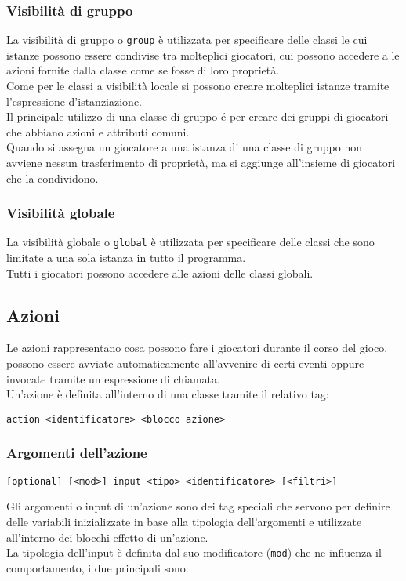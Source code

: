 \subsubsection{Visibilità di gruppo}
La visibilità di gruppo o \lstinline|group| è utilizzata per specificare delle classi le cui istanze possono
essere condivise tra molteplici giocatori, cui possono accedere a le azioni fornite dalla classe come 
se fosse di loro proprietà. \\
Come  per le classi a visibilità locale si possono creare molteplici istanze tramite l'espressione d'istanziazione. \\
Il principale utilizzo di una classe di gruppo é per creare dei gruppi di giocatori che abbiano
azioni e attributi comuni. \\
Quando si assegna un giocatore a una istanza di una classe di gruppo non avviene nessun trasferimento
di proprietà, ma si aggiunge all'insieme di giocatori che la condividono.

\subsubsection{Visibilità globale}
La visibilità globale o \lstinline|global| è utilizzata per specificare delle classi che sono 
limitate a una sola istanza in tutto il programma. \\
Tutti i giocatori possono accedere alle azioni delle classi globali.

\subsection{Azioni}
Le azioni rappresentano cosa possono fare i giocatori durante il corso del gioco, possono essere avviate
automaticamente all'avvenire di certi eventi oppure invocate tramite un espressione di chiamata.\\
Un'azione è definita all'interno di una classe tramite il relativo tag: \\
\begin{lstlisting}
action <identificatore> <blocco azione>
\end{lstlisting}

\subsubsection{Argomenti dell'azione}
\begin{lstlisting}
[optional] [<mod>] input <tipo> <identificatore> [<filtri>]
\end{lstlisting}
Gli argomenti o input di un’azione sono dei tag speciali che servono per definire delle variabili 
inizializzate in base alla tipologia dell’argomenti e utilizzate all’interno dei 
blocchi effetto di un’azione. \\
La tipologia dell'input è definita dal suo modificatore (\lstinline|mod|) che ne influenza il comportamento, 
i due principali sono:

